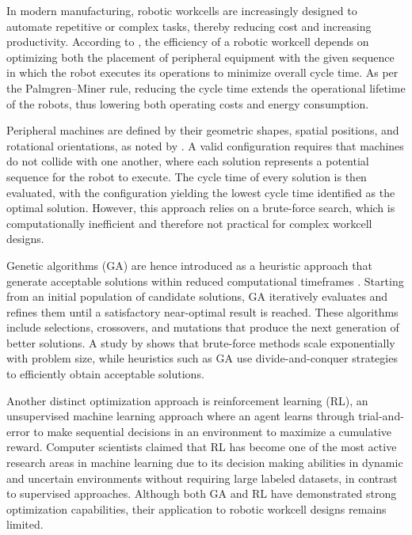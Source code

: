 \documentclass{article}
\begin{document}
In modern manufacturing, robotic workcells are increasingly designed to automate repetitive or complex tasks, thereby reducing cost and increasing productivity. According to \textcite{US6470301B1}, the efficiency of a robotic workcell depends on optimizing both the placement of peripheral equipment with the given sequence in which the robot executes its operations to minimize overall cycle time. As per the Palmgren–Miner rule, reducing the cycle time extends the operational lifetime of the robots, thus lowering both operating costs and energy consumption.

Peripheral machines are defined by their geometric shapes, spatial positions, and rotational orientations, as noted by \textcite{US6470301B1}. A valid configuration requires that machines do not collide with one another, where each solution represents a potential sequence for the robot to execute. The cycle time of every solution is then evaluated, with the configuration yielding the lowest cycle time identified as the optimal solution. However, this approach relies on a brute-force search, which is computationally inefficient and therefore not practical for complex workcell designs.

Genetic algorithms (GA) are hence introduced as a heuristic approach that generate acceptable solutions within reduced computational timeframes \parencite{mi2024heuristic}. Starting from an initial population of candidate solutions, GA iteratively evaluates and refines them until a satisfactory near-optimal result is reached. These algorithms include selections, crossovers, and mutations that produce the next generation of better solutions. A study by \textcite{10697945} shows that brute-force methods scale exponentially with problem size, while heuristics such as GA use divide-and-conquer strategies to efficiently obtain acceptable solutions.

Another distinct optimization approach is reinforcement learning (RL), an unsupervised machine learning approach where an agent learns through trial-and-error to make sequential decisions in an environment to maximize a cumulative reward. Computer scientists \textcite{sutton2018reinforcement} claimed that RL has become one of the most active research areas in machine learning due to its decision making abilities in dynamic and uncertain environments without requiring large labeled datasets, in contrast to supervised approaches. Although both GA and RL have demonstrated strong optimization capabilities, their application to robotic workcell designs remains limited.
\end{document}
